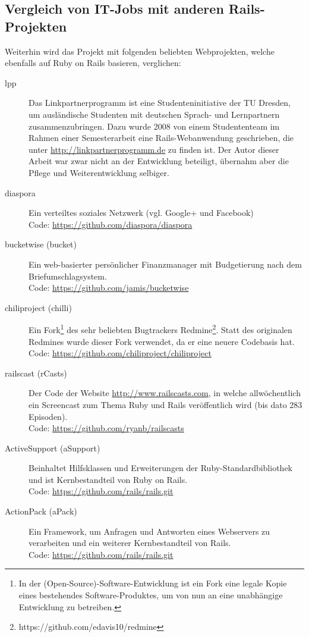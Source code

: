 \subsection{Vergleich von IT-Jobs mit anderen Rails-Projekten}
Weiterhin wird das Projekt mit folgenden beliebten Webprojekten, welche ebenfalls auf Ruby on Rails basieren, verglichen:
\begin{description}
\item[lpp] Das Linkpartnerprogramm ist eine Studenteninitiative der TU Dresden, um ausländische Studenten mit deutschen Sprach- und Lernpartnern zusammenzubringen. Dazu wurde 2008 von einem Studententeam im Rahmen einer Semesterarbeit eine Rails-Webanwendung geschrieben, die unter \url{http://linkpartnerprogramm.de} zu finden ist. Der Autor dieser Arbeit war zwar nicht an der Entwicklung beteiligt, übernahm aber die Pflege und Weiterentwicklung selbiger.
 \item[diaspora] Ein verteiltes soziales Netzwerk (vgl. Google+ und Facebook) \\
 Code: \url{https://github.com/diaspora/diaspora}
 \item[bucketwise (bucket)] Ein web-basierter persönlicher Finanzmanager mit Budgetierung nach dem Briefumschlagsystem.\\
 Code: \url{https://github.com/jamis/bucketwise}
 \item[chiliproject (chilli)] Ein Fork\footnote{In der (Open-Source)-Software-Entwicklung ist ein Fork eine legale Kopie eines bestehendes Software-Produktes, um von nun an eine unabhängige Entwicklung zu betreiben.} des sehr beliebten Bugtrackers Redmine\footnote{https://github.com/edavis10/redmine}. Statt des originalen Redmines wurde dieser Fork verwendet, da er eine neuere Codebasis hat.\\
 Code: \url{https://github.com/chiliproject/chiliproject}
 \item[railscast (rCasts)] Der Code der Website \url{http://www.railscasts.com}, in welche allwöchentlich ein Screencast zum Thema Ruby und Rails veröffentlich wird (bis dato 283 Episoden).\\
 Code: \url{https://github.com/ryanb/railscasts}
 \item[ActiveSupport (aSupport)] Beinhaltet Hilfsklassen und Erweiterungen der Ruby-Standardbibliothek und ist Kernbestandteil von Ruby on Rails. \\
 Code: \url{https://github.com/rails/rails.git}
 \item[ActionPack (aPack)] Ein Framework, um Anfragen und Antworten eines Webservers zu verarbeiten und ein weiterer Kernbestandteil von Rails.\\
 Code: \url{https://github.com/rails/rails.git}
\end{description}


